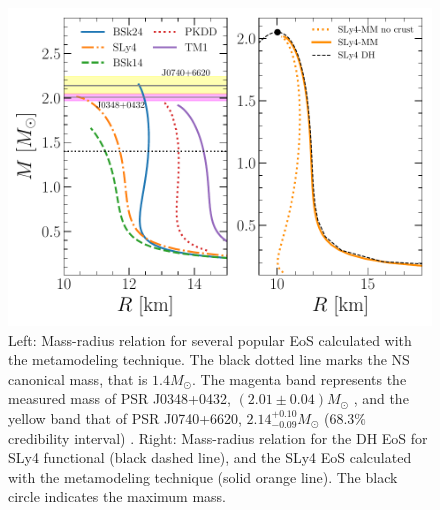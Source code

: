 \begin{figure}[!t]
\begin{center}
  \includegraphics[width=0.9\linewidth]{figures/mr_popular.pdf}
\end{center}
\caption[Mass-radius relation for several popular equations of state]{Left: 
  Mass-radius relation for several popular EoS calculated
  with the metamodeling technique. The black dotted line marks the NS 
canonical mass, that is $1.4M_\odot$. The magenta band represents the measured 
mass of PSR J0348+0432, $(2.01 \pm 0.04)M_\odot$ \cite{Antoniadis2013}, and the 
yellow band that of PSR J0740+6620, $2.14_{-0.09}^{+0.10}M_\odot$ ($68.3\%$ 
credibility interval) \cite{Cromartie2020}.
Right: Mass-radius relation for the DH EoS for SLy4 functional (black dashed
line), and the SLy4 EoS calculated with the metamodeling technique (solid
orange line). The black circle indicates the maximum 
mass.}\label{fig:mr_popular}
\end{figure}
 
